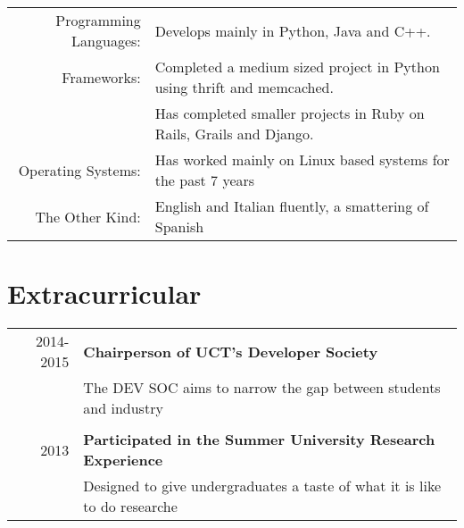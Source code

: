 \documentclass[a4paper,10pt]{article} %
\begin{document}
\begin{tabular}{rl}
Programming Languages:& Develops mainly in Python, Java and C++.\\
Frameworks:& Completed a medium sized project in Python using thrift and memcached. \\
& Has completed smaller projects in Ruby on Rails, Grails and Django. \\
Operating Systems: & Has worked mainly on Linux based systems for the past 7 years\\
The Other Kind: & English and Italian fluently, a smattering of Spanish\\
\end{tabular}

\section{Extracurricular}

\begin{tabular}{rl}



\textsc{2014-2015} & \textbf{Chairperson of UCT's Developer Society}\\
& The DEV SOC aims to narrow the gap between students and industry\\
&\\
\textsc{2013} & \textbf{Participated in the Summer University Research Experience}\\
& Designed to give undergraduates a taste of what it is like to do researche\\



\end{tabular}
\end{document}
